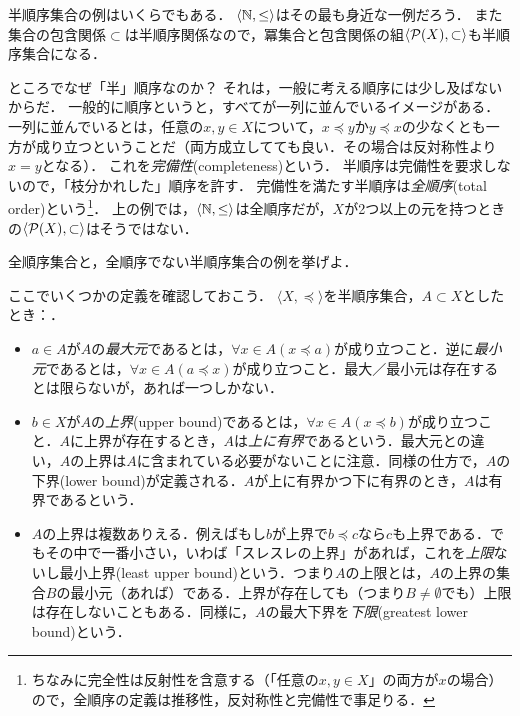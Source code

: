 \documentclass[11pt,a4paper]{jsarticle}
\begin{document}
半順序集合の例はいくらでもある．
$\langle \mathbb{N}, \leq \rangle$はその最も身近な一例だろう．
また集合の包含関係$\subset$は半順序関係なので，冪集合と包含関係の組$\langle \mathcal{P}(X), \subset \rangle$も半順序集合になる．

ところでなぜ「半」順序なのか？
それは，一般に考える順序には少し及ばないからだ．
一般的に順序というと，すべてが一列に並んでいるイメージがある．
一列に並んでいるとは，任意の$x, y \in X$について，$x \preceq y$か$y \preceq x$の少なくとも一方が成り立つということだ（両方成立してても良い．その場合は反対称性より$x=y$となる）．
これを\emph{完備性}(completeness)という．
半順序は完備性を要求しないので，「枝分かれした」順序を許す．
完備性を満たす半順序は\emph{全順序}(total order)という\footnote{ちなみに完全性は反射性を含意する（「任意の$x,y \in X$」の両方が$x$の場合）ので，全順序の定義は推移性，反対称性と完備性で事足りる．}．
%
上の例では，$\langle \mathbb{N}, \leq \rangle$は全順序だが，$X$が2つ以上の元を持つときの$\langle \mathcal{P}(X), \subset \rangle$はそうではない．

\begin{exercise}
 全順序集合と，全順序でない半順序集合の例を挙げよ．
\end{exercise}

ここでいくつかの定義を確認しておこう．
$\langle X, \preceq \rangle$を半順序集合，$A \subset X$としたとき：．
\begin{itemize}
 \item $a \in A$が$A$の\emph{最大元}であるとは，$\forall x \in A (x \preceq a)$が成り立つこと．逆に\emph{最小元}であるとは，$\forall x \in A (a \preceq x)$が成り立つこと．最大／最小元は存在するとは限らないが，あれば一つしかない．
 \item $b \in X$が$A$の\emph{上界}(upper bound)であるとは，$\forall x \in A (x \preceq b)$が成り立つこと．$A$に上界が存在するとき，$A$は\emph{上に有界}であるという．最大元との違い，$A$の上界は$A$に含まれている必要がないことに注意．同様の仕方で，$A$の下界(lower bound)が定義される．$A$が上に有界かつ下に有界のとき，$A$は有界であるという．
 \item $A$の上界は複数ありえる．例えばもし$b$が上界で$b \preceq c$なら$c$も上界である．でもその中で一番小さい，いわば「スレスレの上界」があれば，これを\emph{上限}ないし最小上界(least upper bound)という．つまり$A$の上限とは，$A$の上界の集合$B$の最小元（あれば）である．上界が存在しても（つまり$B \neq \emptyset$でも）上限は存在しないこともある．同様に，$A$の最大下界を\emph{下限}(greatest lower bound)という．
\end{itemize}
\end{document}
